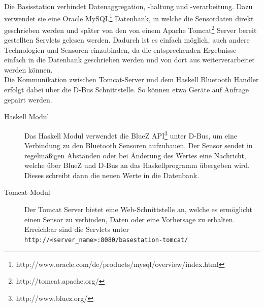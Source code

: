 Die Basisstation verbindet Datenaggregation, -haltung und -verarbeitung. Dazu verwendet sie eine Oracle MySQL\footnote{http://www.oracle.com/de/products/mysql/overview/index.html} Datenbank, in welche die Sensordaten direkt geschrieben werden und später von den von einem Apache Tomcat\footnote{http://tomcat.apache.org/} Server bereit gestellten Servlets gelesen werden. Dadurch ist es einfach möglich, auch andere Technologien und Sensoren einzubinden, da die entsprechenden Ergebnisse einfach in die Datenbank geschrieben werden und von dort aus weiterverarbeitet werden können.\\
Die Kommunikation zwischen Tomcat-Server und dem Haskell Bluetooth Handler erfolgt dabei über die D-Bus Schnittstelle. So können etwa Geräte auf Anfrage gepairt werden.
\begin{description}
	\item[Haskell Modul] Das Haskell Modul verwendet die BlueZ API\footnote{http://www.bluez.org/} unter D-Bus, um eine Verbindung zu den Bluetooth Sensoren aufzubauen. Der Sensor sendet in regelmäßigen Abständen oder bei Änderung des Wertes eine Nachricht, welche über BlueZ und D-Bus an das Haskellprogramm übergeben wird. Dieses schreibt dann die neuen Werte in die Datenbank.
	
	\item[Tomcat Modul] Der Tomcat Server bietet eine Web-Schnittstelle an, welche es ermöglicht einen Sensor zu verbinden, Daten oder eine Vorhersage zu erhalten.
	Erreichbar sind die Servlets unter \texttt{http://<server\_name>:8080/basestation-tomcat/}
	

\end{description}
